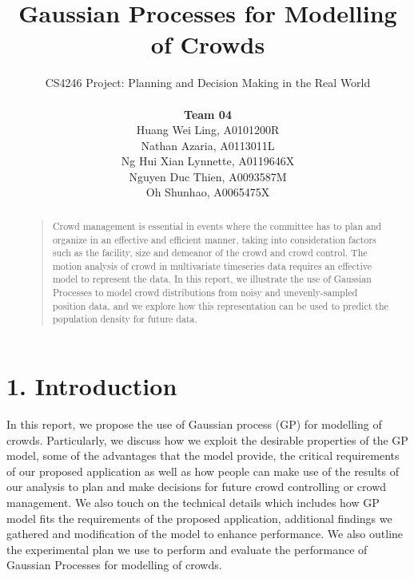 \documentclass[letterpaper]{article}
\begin{document}
%
\title{Gaussian Processes for Modelling of Crowds}
\author{CS4246 Project: Planning and Decision Making in the Real World  \\ \\
{\bf Team 04} \\
Huang Wei Ling, A0101200R\\
Nathan Azaria, A0113011L\\
Ng Hui Xian Lynnette, A0119646X\\
Nguyen Duc Thien, A0093587M\\
Oh Shunhao, A0065475X\\
}
\maketitle
\begin{abstract}
\begin{quote}
Crowd management is essential in events where the committee has to plan and organize in an effective and efficient manner, taking into consideration factors such as the facility, size and demeanor of the crowd and crowd control. The motion analysis of crowd in multivariate timeseries data requires an effective model to represent the data. In this report, we illustrate the use of Gaussian Processes to model crowd distributions from noisy and unevenly-sampled position data, and we explore how this representation can be used to predict the population density for future data.
\end{quote}
\end{abstract}

\section{1.  Introduction}
In this report, we propose the use of Gaussian process (GP) for modelling of crowds. Particularly, we discuss how we exploit the desirable properties of the GP model, some of the advantages that the model provide, the critical requirements of our proposed application as well as how people can make use of the results of our analysis to plan and make decisions for future crowd controlling or crowd management. We also touch on the technical details which includes how GP model fits the requirements of the proposed application, additional findings we gathered and modification of the model to enhance performance. We also outline the experimental plan we use to perform and evaluate the performance of Gaussian Processes for modelling of crowds. \\
\end{document}
